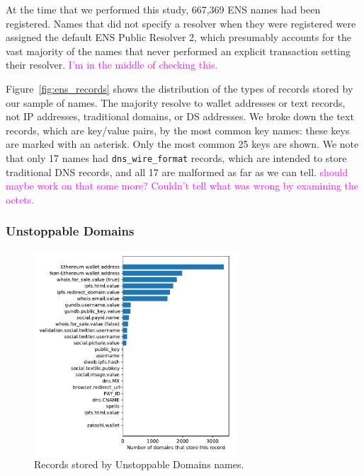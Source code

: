 \documentclass[10pt,sigconf,letterpaper]{acmart}
\newcommand{\randall}{\ding{110}\ding{43}\textcolor{magenta}}
\newcommand{\randall}{}
\begin{document}
At the time that we performed this study, 667,369 ENS names had been 
registered. Names that did not specify a resolver when they were registered 
were assigned the default ENS Public Resolver 2, which presumably accounts for 
the vast majority of the names that never performed an explicit transaction 
setting their resolver. \randall{I'm in the middle of checking this.} 

Figure~\ref{fig:ens_records} shows the distribution of the types of records 
stored by our sample of names. The majority resolve to wallet addresses or text 
records, not IP addresses, traditional domains, or DS addresses. We broke down 
the text records, which are key/value pairs, by the most common key names: 
these keys are marked with an asterisk. Only the most common 25 keys are shown. 
We note that only 17 names had \texttt{dns\_wire\_format} records, which are 
intended to store traditional DNS 
records, and all 17 are malformed as far as we can tell. \randall{should maybe 
work on that some more? Couldn't tell what was wrong by examining the octets.}

%

\subsubsection{Unstoppable Domains}

\begin{figure}[t]
	\centering
	\includegraphics[width=3in]{figs/all_unstoppable_records.pdf}
	\caption{Records stored by Unstoppable Domains names.}
	\label{fig:unstoppable_records}
\end{figure}
\end{document}
